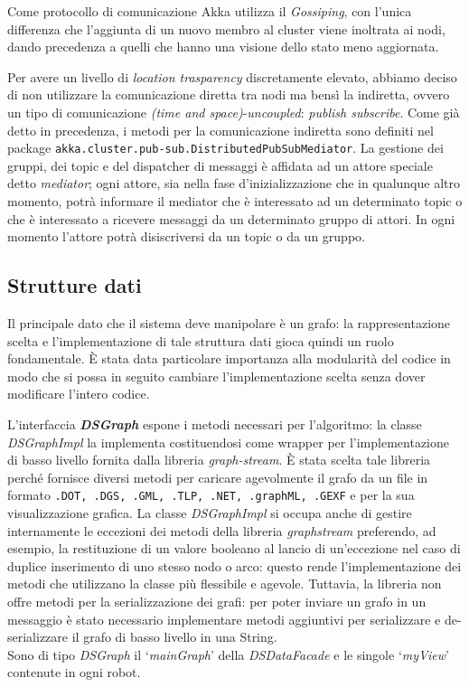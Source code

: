 Come protocollo di comunicazione Akka utilizza il \emph{Gossiping},
con l'unica differenza che l'aggiunta di un nuovo membro al cluster viene
inoltrata ai nodi, dando precedenza a quelli che hanno una visione
dello stato meno aggiornata.

Per avere un livello di \emph{location trasparency} discretamente elevato,
abbiamo deciso di non utilizzare la comunicazione diretta tra nodi ma bensì
la indiretta, ovvero un tipo di comunicazione \emph{(time and space)}-\emph{uncoupled}:
 \emph{publish subscribe}.
Come già detto in precedenza, i metodi per la comunicazione indiretta
sono definiti nel package \texttt{akka.cluster.pub-sub.DistributedPubSubMediator}.
La gestione dei gruppi, dei topic e del dispatcher di messaggi è affidata ad un attore speciale detto \emph{mediator};
ogni attore, sia nella fase d'inizializzazione che in qualunque altro momento, potrà informare
il mediator che è interessato ad un determinato topic o che è interessato a ricevere messaggi
da un determinato gruppo di attori. In ogni momento l'attore potrà disiscriversi da un topic o da un gruppo.
 





\subsection{Strutture dati}
Il principale dato che il sistema deve manipolare è un grafo:
la rappresentazione scelta e l'implementazione di tale struttura dati
gioca quindi un ruolo fondamentale. \`E stata data particolare
importanza alla modularità del codice in modo che si possa in seguito
cambiare l'implementazione scelta senza dover modificare l'intero
codice.

L'interfaccia \textbf{\emph{DSGraph}} espone i metodi necessari per
l'algoritmo: la classe \emph{DSGraphImpl} la implementa costituendosi
come wrapper per l'implementazione di basso livello fornita dalla
libreria \emph{graph-stream}. \`E stata scelta tale libreria perché
fornisce diversi metodi per caricare agevolmente il grafo da un file
in formato \texttt{.DOT, .DGS, .GML, .TLP, .NET, .graphML, .GEXF}
e per la sua visualizzazione grafica.
La classe \emph{DSGraphImpl} si occupa anche di gestire internamente
le eccezioni dei metodi della libreria \emph{graphstream} preferendo,
ad esempio,
la restituzione di un valore booleano al lancio di un'eccezione
nel caso di duplice inserimento di uno stesso nodo o arco: questo
rende l'implementazione dei metodi che utilizzano la classe più
flessibile e agevole.
Tuttavia, la libreria non offre metodi per la serializzazione
dei grafi: per poter inviare un grafo in un messaggio è stato
necessario implementare metodi aggiuntivi per serializzare e
de-serializzare il grafo di basso livello in una String.\\
Sono di tipo \emph{DSGraph} il `\emph{mainGraph}' della
\emph{DSDataFacade} e le singole `\emph{myView}' contenute in ogni
robot.

